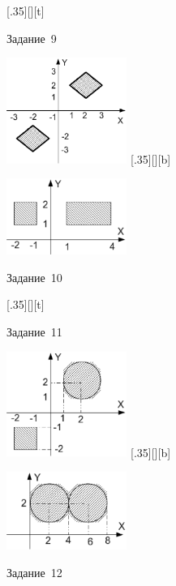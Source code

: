 \begin{figure}[H]
\begin{floatrow}
[.35\textwidth][\FBheight][t]
{\caption{Задание~9}
\label{ch03:refDrawing71}}
{\includegraphics[width=0.35\textwidth,keepaspectratio]{img/ris_3_72}}%
%
[.35\textwidth][\FBheight][b]
{\caption{Задание~10}
\label{ch03:refDrawing72}}
{\includegraphics[width=0.35\textwidth]{img/ris_3_73}}
\end{floatrow}
\end{figure}

\begin{figure}[H]
\begin{floatrow}
[.35\textwidth][\FBheight][t]
{\caption{Задание~11}
\label{ch03:refDrawing73}}
{\includegraphics[width=0.35\textwidth,keepaspectratio]{img/ris_3_74}}%
%
[.35\textwidth][\FBheight][b]
{\caption{Задание~12}
\label{ch03:refDrawing74}}
{\includegraphics[width=0.35\textwidth]{img/ris_3_75}}
\end{floatrow}
\end{figure}

